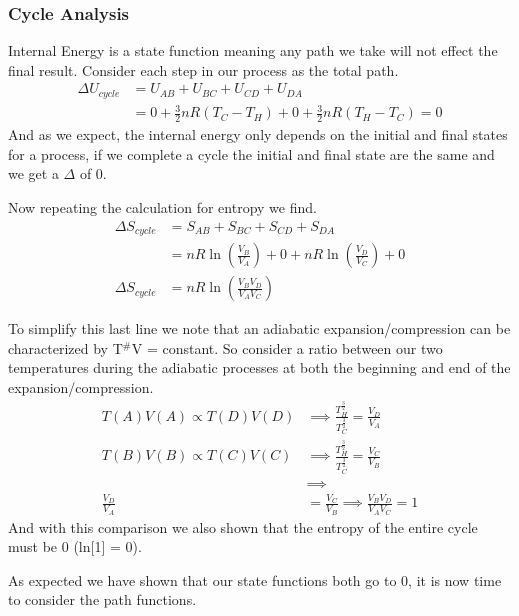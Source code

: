 \documentclass{article}
\begin{document}
\subsubsection*{Cycle Analysis}
Internal Energy is a state function meaning any path we take will not effect the final result.
Consider each step in our process as the total path.
\begin{equation}
\begin{split}
\Delta U_{cycle} &= U_{AB} + U_{BC} + U_{CD} + U_{DA} \\
& = 0 + \frac{3}{2}nR(T_C-T_H) + 0 + \frac{3}{2}nR(T_H-T_C) = 0
\end{split}
\end{equation}
And as we expect, the internal energy only depends on the initial and final states for a process, if we complete a cycle the initial and final state are the same and we get a $\Delta$ of 0. 

Now repeating the calculation for entropy we find. 
\begin{equation}
\begin{split}
\Delta S_{cycle} &= S_{AB} + S_{BC} + S_{CD} + S_{DA} \\
& =  nR\ln\left(\frac{V_B}{V_A}\right) + 0 +  nR\ln\left(\frac{V_D}{V_C}\right) + 0 \\
\Delta S_{cycle} &= nR\ln\left(\frac{V_BV_D}{V_AV_C}\right)
\end{split}
\end{equation}

To simplify this last line we note that an adiabatic expansion/compression can be characterized by T$^\#$V = constant. 
So consider a ratio between our two temperatures during the adiabatic processes at both the beginning and end of the expansion/compression.
\begin{equation}
\begin{split}
T(A)V(A) \propto T(D)V(D) &\implies \frac{T^{\frac{3}{2}}_H}{T^{\frac{3}{2}}_C} = \frac{V_D}{V_A}\\
T(B)V(B) \propto T(C)V(C) &\implies \frac{T^{\frac{3}{2}}_H}{T^{\frac{3}{2}}_C} = \frac{V_C}{V_B}\\ 
&\implies\\
\frac{V_D}{V_A} &= \frac{V_C}{V_B} \implies \frac{V_BV_D}{V_AV_C} = 1
\end{split}
\end{equation}
And with this comparison we also shown that the entropy of the entire cycle must be 0 (ln[1] = 0). 

As expected we have shown that our state functions both go to 0, it is now time to consider the path functions. 
\end{document}
